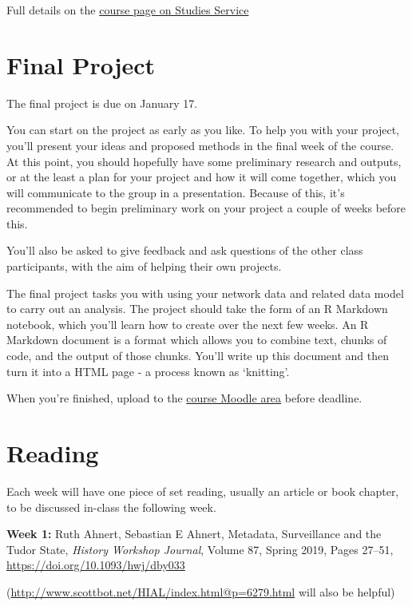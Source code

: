 \documentclass[
]{book}
\begin{document}
Full details on the \href{https://studies.helsinki.fi/courses/cur/hy-opt-cur-2223-7c9cdedc-fc7b-4e66-b793-1dbe0db868b7}{course page on Studies
Service}

\hypertarget{final-project}{%
\section{Final Project}\label{final-project}}

The final project is due on January 17.

You can start on the project as early as you like. To help you with your
project, you'll present your ideas and proposed methods in the final
week of the course. At this point, you should hopefully have some
preliminary research and outputs, or at the least a plan for your
project and how it will come together, which you will communicate to the
group in a presentation. Because of this, it's recommended to begin
preliminary work on your project a couple of weeks before this.

You'll also be asked to give feedback and ask questions of the other
class participants, with the aim of helping their own projects.

The final project tasks you with using your network data and related
data model to carry out an analysis. The project should take the form of
an R Markdown notebook, which you'll learn how to create over the next
few weeks. An R Markdown document is a format which allows you to
combine text, chunks of code, and the output of those chunks. You'll
write up this document and then turn it into a HTML page - a process
known as `knitting'.

When you're finished, upload to the \href{https://moodle.helsinki.fi/course/view.php?id=52795}{course Moodle area} before deadline.

\hypertarget{reading}{%
\section{Reading}\label{reading}}

Each week will have one piece of set reading, usually an article or book
chapter, to be discussed in-class the following week.

\textbf{Week 1:} Ruth Ahnert, Sebastian E Ahnert, Metadata, Surveillance and
the Tudor State, \emph{History Workshop Journal}, Volume 87, Spring 2019,
Pages 27--51, \url{https://doi.org/10.1093/hwj/dby033}

(\url{http://www.scottbot.net/HIAL/index.html@p=6279.html}
will also be helpful)
\end{document}
